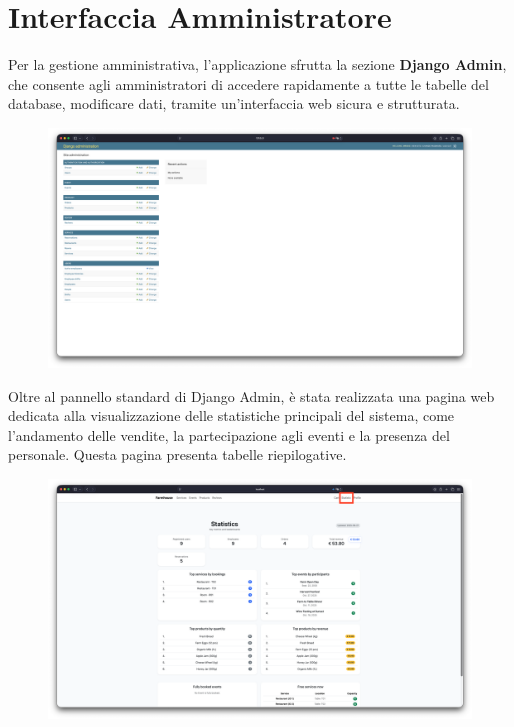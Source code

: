 \documentclass[a4paper,12pt]{report}
\begin{document}
\newpage
\section{Interfaccia Amministratore}
Per la gestione amministrativa, l'applicazione sfrutta la sezione
\textbf{Django Admin},
che consente agli amministratori di accedere rapidamente a tutte le
tabelle del database,
modificare dati, tramite un'interfaccia web sicura e strutturata.

\begin{figure}[H]
  \centering
  \includegraphics[width=\textwidth, trim=0 0 0 0]{./img/admin/djangoAdmin.png}
  \vspace{-1em}
  \label{fig:django-admin}
\end{figure}

Oltre al pannello standard di Django Admin, è stata realizzata una
pagina web dedicata alla
visualizzazione delle statistiche principali del sistema, come
l'andamento delle vendite, la
partecipazione agli eventi e la presenza del personale. Questa pagina
presenta tabelle
riepilogative.

\begin{figure}[H]
  \centering
  \includegraphics[width=\textwidth, trim=0 0 0 0]{./img/admin/statistic.png}
  \vspace{-1em}
  \label{fig:statistiche}
\end{figure}
\end{document}

